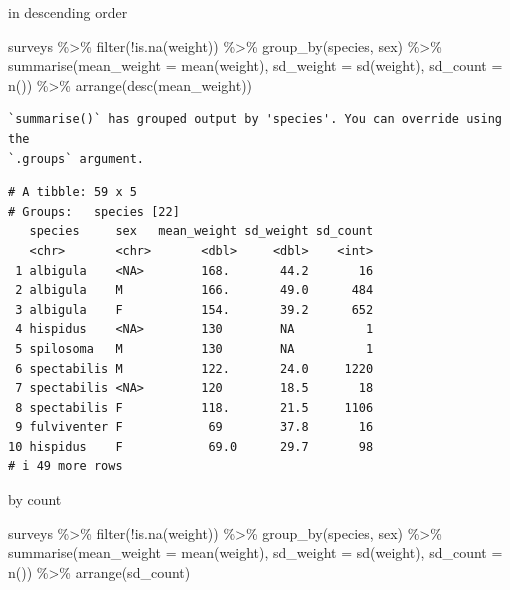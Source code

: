 \documentclass[
  letterpaper,
  DIV=11,
  numbers=noendperiod]{scrreprt}
\newenvironment{Shaded}{\begin{snugshade}}{\end{snugshade}}
\newcommand{\AttributeTok}[1]{\textcolor[rgb]{0.40,0.45,0.13}{#1}}
\newcommand{\FunctionTok}[1]{\textcolor[rgb]{0.28,0.35,0.67}{#1}}
\newcommand{\NormalTok}[1]{\textcolor[rgb]{0.00,0.23,0.31}{#1}}
\newcommand{\SpecialCharTok}[1]{\textcolor[rgb]{0.37,0.37,0.37}{#1}}
\begin{document}
in descending order

\begin{Shaded}
\begin{Highlighting}[]
\NormalTok{surveys }\SpecialCharTok{\%\textgreater{}\%}
    \FunctionTok{filter}\NormalTok{(}\SpecialCharTok{!}\FunctionTok{is.na}\NormalTok{(weight)) }\SpecialCharTok{\%\textgreater{}\%}
    \FunctionTok{group\_by}\NormalTok{(species, sex) }\SpecialCharTok{\%\textgreater{}\%}
    \FunctionTok{summarise}\NormalTok{(}\AttributeTok{mean\_weight =} \FunctionTok{mean}\NormalTok{(weight), }\AttributeTok{sd\_weight =} \FunctionTok{sd}\NormalTok{(weight), }\AttributeTok{sd\_count =} \FunctionTok{n}\NormalTok{()) }\SpecialCharTok{\%\textgreater{}\%}
    \FunctionTok{arrange}\NormalTok{(}\FunctionTok{desc}\NormalTok{(mean\_weight))}
\end{Highlighting}
\end{Shaded}

\begin{verbatim}
`summarise()` has grouped output by 'species'. You can override using the
`.groups` argument.
\end{verbatim}

\begin{verbatim}
# A tibble: 59 x 5
# Groups:   species [22]
   species     sex   mean_weight sd_weight sd_count
   <chr>       <chr>       <dbl>     <dbl>    <int>
 1 albigula    <NA>        168.       44.2       16
 2 albigula    M           166.       49.0      484
 3 albigula    F           154.       39.2      652
 4 hispidus    <NA>        130        NA          1
 5 spilosoma   M           130        NA          1
 6 spectabilis M           122.       24.0     1220
 7 spectabilis <NA>        120        18.5       18
 8 spectabilis F           118.       21.5     1106
 9 fulviventer F            69        37.8       16
10 hispidus    F            69.0      29.7       98
# i 49 more rows
\end{verbatim}

by count

\begin{Shaded}
\begin{Highlighting}[]
\NormalTok{surveys }\SpecialCharTok{\%\textgreater{}\%}
    \FunctionTok{filter}\NormalTok{(}\SpecialCharTok{!}\FunctionTok{is.na}\NormalTok{(weight)) }\SpecialCharTok{\%\textgreater{}\%}
    \FunctionTok{group\_by}\NormalTok{(species, sex) }\SpecialCharTok{\%\textgreater{}\%}
    \FunctionTok{summarise}\NormalTok{(}\AttributeTok{mean\_weight =} \FunctionTok{mean}\NormalTok{(weight), }\AttributeTok{sd\_weight =} \FunctionTok{sd}\NormalTok{(weight), }\AttributeTok{sd\_count =} \FunctionTok{n}\NormalTok{()) }\SpecialCharTok{\%\textgreater{}\%}
    \FunctionTok{arrange}\NormalTok{(sd\_count)}
\end{Highlighting}
\end{Shaded}
\end{document}
